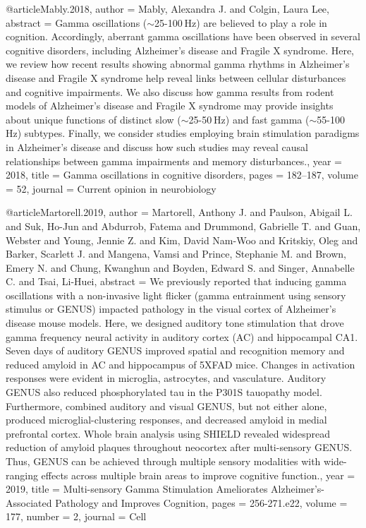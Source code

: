 @article{Mably.2018,
 author = {Mably, Alexandra J. and Colgin, Laura Lee},
 abstract = {Gamma oscillations ($\sim$25-100 Hz) are believed to play a role in cognition. Accordingly, aberrant gamma oscillations have been observed in several cognitive disorders, including Alzheimer's disease and Fragile X syndrome. Here, we review how recent results showing abnormal gamma rhythms in Alzheimer's disease and Fragile X syndrome help reveal links between cellular disturbances and cognitive impairments. We also discuss how gamma results from rodent models of Alzheimer's disease and Fragile X syndrome may provide insights about unique functions of distinct slow ($\sim$25-50 Hz) and fast gamma ($\sim$55-100 Hz) subtypes. Finally, we consider studies employing brain stimulation paradigms in Alzheimer's disease and discuss how such studies may reveal causal relationships between gamma impairments and memory disturbances.},
 year = {2018},
 title = {{Gamma oscillations in cognitive disorders}},
 pages = {182--187},
 volume = {52},
 journal = {{Current opinion in neurobiology}}
}


@article{Martorell.2019,
 author = {Martorell, Anthony J. and Paulson, Abigail L. and Suk, Ho-Jun and Abdurrob, Fatema and Drummond, Gabrielle T. and Guan, Webster and Young, Jennie Z. and Kim, David Nam-Woo and Kritskiy, Oleg and Barker, Scarlett J. and Mangena, Vamsi and Prince, Stephanie M. and Brown, Emery N. and Chung, Kwanghun and Boyden, Edward S. and Singer, Annabelle C. and Tsai, Li-Huei},
 abstract = {We previously reported that inducing gamma oscillations with a non-invasive light flicker (gamma entrainment using sensory stimulus or GENUS) impacted pathology in the visual cortex of Alzheimer's disease mouse models. Here, we designed auditory tone stimulation that drove gamma frequency neural activity in auditory cortex (AC) and hippocampal CA1. Seven days of auditory GENUS improved spatial and recognition memory and reduced amyloid in AC and hippocampus of 5XFAD mice. Changes in activation responses were evident in microglia, astrocytes, and vasculature. Auditory GENUS also reduced phosphorylated tau in the P301S tauopathy model. Furthermore, combined auditory and visual GENUS, but not either alone, produced microglial-clustering responses, and decreased amyloid in medial prefrontal cortex. Whole brain analysis using SHIELD revealed widespread reduction of amyloid plaques throughout neocortex after multi-sensory GENUS. Thus, GENUS can be achieved through multiple sensory modalities with wide-ranging effects across multiple brain areas to improve cognitive function.},
 year = {2019},
 title = {{Multi-sensory Gamma Stimulation Ameliorates Alzheimer's-Associated Pathology and Improves Cognition}},
 pages = {256-271.e22},
 volume = {177},
 number = {2},
 journal = {{Cell}}
}


